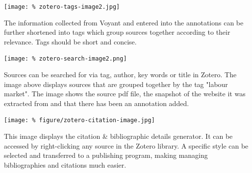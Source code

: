 \documentclass[unknownkeysallowed,usepdftitle=false, aspectratio=169, parskip=full]{beamer}
\newcommand{\secvariable}{nothing}
\newcommand{\mysection}[1]{\renewcommand{\secvariable}{#1}
}
\begin{document}
\mysection{slab}
\begin{frame}\label{\secvariable}
\begin{center}
\texttt{[image: \%
zotero-tags-image2.jpg]}
\end{center}
    \parbox{\linewidth}{

The information collected from Voyant and entered into the annotations can be further shortened into tags which group sources together according to their relevance. Tags should be short and concise.
}

\end{frame}


\mysection{minor}
\begin{frame}\label{\secvariable} %
\begin{center}
\texttt{[image: \%
zotero-search-image2.png]}
\end{center}
\vspace{-0.2cm}

Sources can be searched for via tag, author, key words or title in Zotero. The image above displays sources that are grouped together by the tag "labour market". The image shows the source pdf file, the snapshot of the website it was extracted from and that there has been an annotation added. 

\end{frame}

\mysection{minor}
\begin{frame}\label{\secvariable} %
\begin{center}
\texttt{[image: \%
figure/zotero-citation-image.jpg]}
\end{center}
\vspace{-0.2cm}

%
This image displays the citation & bibliographic details generator. It can be accessed by right-clicking any source in the Zotero library. A specific style can be selected and transferred to a publishing program, making managing bibliographies and citations much easier.


\end{frame}
\end{document}

